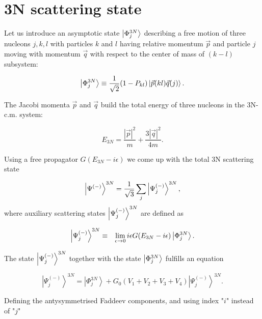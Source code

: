 \section{3N scattering state}

    Let us
    introduce an asymptotic state $\ket{\Phi^{3N}_j}$ describing a free motion
    of three nucleons ${j,k,l}$ with particles $k$ and $l$ 
    having relative momentum $\vec{p}$
    and particle $j$ moving with momentum $\vec{q}$ with respect to the 
    center of mass of $(k-l)$ subsystem:
    
    \begin{equation}
        \ket{\Phi^{3N}_j} \equiv \frac{1}{\sqrt{2}}(1 - P_{kl})
        \ket{\vec{p}(kl)\vec{q}(j)}.\\
    \end{equation}

    The Jacobi momenta $\vec{p}$ and $\vec{q}$ build the total energy of three
    nucleons in the 3N-c.m. system:
    
    \begin{equation}
        E_{3N} = \frac{|\vec{p}|^2}{m} + \frac{3 |\vec{q}|^2}{4m}.
    \end{equation}
    
    Using a free propagator $G(E_{3N} - i\epsilon)$ we come up with
    the total 3N scattering state

    \begin{equation}
        \ket{\Psi^{(-)}}^{3N} = \frac{1}{\sqrt{3}} \sum_j\ket{\Psi^{(-)}_j}^{3N},  
    \end{equation}
    where auxiliary scattering states $\ket{\Psi^{(-)}_j}^{3N}$ are defined as \cite{Glockle1983} 

    \begin{eqnarray}
        \ket{\Psi^{(-)}_j}^{3N}  &\equiv& \lim_{\epsilon \rightarrow 0}
        i \epsilon G(E_{3N} - i\epsilon)\ket{\Phi^{3N}_j}.
    \end{eqnarray}

    The state $\ket{\Psi^{(-)}_j}^{3N}$ together with the state $\ket{\Phi^{3N}_j}$ fulfills an equation \cite{Glockle1983}

    \begin{equation}
        \left|\Psi_j^{(-)}\right\rangle^{3 N}=\left|\Phi_j^{3 N}\right\rangle+
        G_0\left(V_1+V_2+V_3+V_4\right)\left|\Psi_j^{(-)}\right\rangle^{3 N}.
    \end{equation}

    Defining the antysymmetrised Faddeev components, and using index "$i$" instead of "$j$"

